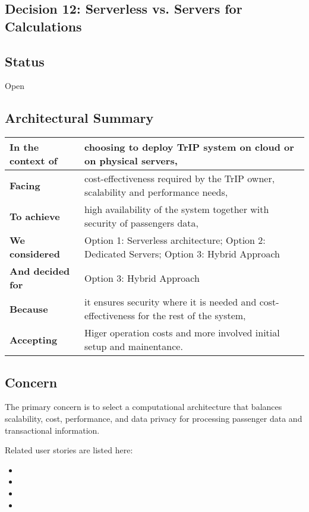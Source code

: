 \subsection{Decision 12: Serverless vs. Servers for Calculations}

\subsection*{Status}
Open

\subsection*{Architectural Summary}
\begin{tabular}{|p{3.5cm}|p{10.5cm}|}
    \hline
    \textbf{In the context of} & choosing to deploy TrIP system on cloud or on physical servers, \\
    \hline
    \textbf{Facing} & cost-effectiveness required by the TrIP owner, scalability and performance needs, \\
    \hline
    \textbf{To achieve} & high availability of the system together with security of passengers data, \\
    \hline
    \textbf{We considered} & Option 1: Serverless architecture; Option 2: Dedicated Servers; Option 3: Hybrid Approach\\
    \hline
    \textbf{And decided for} & Option 3: Hybrid Approach \\
    \hline
    \textbf{Because} & it ensures security where it is needed and cost-effectiveness for the rest of the system, \\
    \hline
    \textbf{Accepting} & Higer operation costs and more involved initial setup and mainentance. \\
    \hline
\end{tabular}

\subsection*{Concern}
The primary concern is to select a computational architecture that balances scalability, cost, performance, and data privacy for processing passenger data and transactional information.

Related user stories are listed here:
\begin{itemize}
    \item \userStoryTwentyNine
    \item \userStoryThirty
    \item \userStoryThirtyOne
    \item \userStoryEighteen
\end{itemize}

